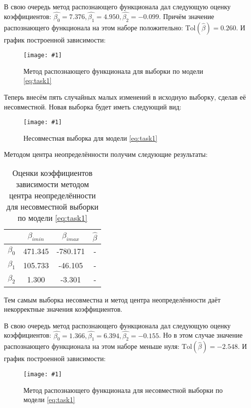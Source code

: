 \documentclass[a4paper,12pt]{article}
\newcommand{\plot}[3]{
    \begin{figure}[H]
        \texttt{[image: \#1]}
        \caption{#2}
        \label{#3}
    \end{figure}
}
\begin{document}
    \noindent В свою очередь метод распознающего функционала дал следующую оценку коэффициентов:
    $ \hat{\beta_{0}} = 7.376, \hat{\beta_{1}} = 4.950, \hat{\beta_{2}} = -0.099 $.
    Причём значение распознающего функционала на этом наборе положительно: $ \text{Tol}(\hat{\beta}) = 0.260 $.
    \newline
    И график построенной зависимости:
    \plot{TolValidData25}{Метод распознающего функционала для выборки по модели \ref{eq:task1}}{p:tolvaliddata25}

    \noindent Теперь внесём пять случайных малых изменений в исходную выборку, сделав её несовместной.
    Новая выборка будет иметь следующий вид:
    \plot{DataWithEstims25}{Несовместная выборка для модели \ref{eq:task1}}{p:estimdata25} 
    
    \noindent Методом центра неопределённости получим следующие результаты:
    \begin{table}[H]
        \begin{center}
            \begin{tabular}{| c | c | c | c |}
                \hline
                & $ \beta_{imin} $ & $ \beta_{imax} $ & $ \hat{\beta} $ \\
                \hline
                $ \beta_{0} $ & 471.345 & -780.171 & - \\
                \hline
                $ \beta_{1} $ & 105.733 & -46.105 & - \\
                \hline
                $ \beta_{2} $ & 1.300 & -3.301 & - \\
                \hline
            \end{tabular}
        \end{center}
        \caption{Оценки коэффициентов зависимости методом центра неопределённости для несовместной выборки по модели \ref{eq:task1}}
        \label{t:estimdata25}
    \end{table}
    \noindent Тем самым выборка несовместна и метод центра неопределённости даёт некорректные значения коэффициентов. 

    \noindent В свою очередь метод распознающего функционала дал следующую оценку коэффициентов:
    $ \hat{\beta_{0}} = 1.366, \hat{\beta_{1}} = 6.394, \hat{\beta_{2}} = -0.155 $.
    Но в этом случае значение распознающего функционала на этом наборе меньше нуля: $ \text{Tol}(\hat{\beta}) = -2.548 $.
    \newline
    И график построенной зависимости:
    \plot{TolDataWithEstims25}{Метод распознающего функционала для несовместной выборки по модели \ref{eq:task1}}{p:tolestimdata25}
\end{document}
